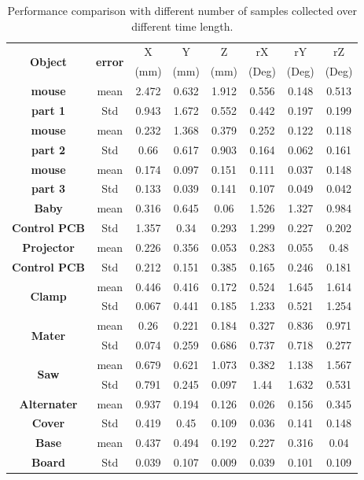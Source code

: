 \documentclass{ieeeaccess}
\begin{document}
\begin{table}
\setlength{\tabcolsep}{3pt}
\centering
\begin{tabular}{| c | c | c | c | c | c | c | c |}
\hline
\multirow{2}{*}{\textbf{Object}} & \multirow{2}{*}{\textbf{error}} & X  & Y & Z & rX & rY  & rZ  \\
 & & (mm) & (mm) & (mm) & (Deg) & (Deg) & (Deg) \\
\hline
\textbf{mouse}  & mean & 2.472 & 0.632 & 1.912 & 0.556 & 0.148 & 0.513 \\ \cline{2-8}
\textbf{part 1} & Std & 0.943 & 1.672 & 0.552 & 0.442 & 0.197 & 0.199 \\
\hline
\textbf{mouse} & mean & 0.232 & 1.368 & 0.379 & 0.252 & 0.122 & 0.118 \\ \cline{2-8}
\textbf{part 2} & Std & 0.66 & 0.617 & 0.903 & 0.164 & 0.062 & 0.161 \\
\hline
\textbf{mouse} & mean & 0.174 & 0.097 & 0.151 & 0.111 & 0.037 & 0.148 \\ \cline{2-8}
\textbf{part 3} & Std & 0.133 & 0.039 & 0.141 & 0.107 & 0.049 & 0.042 \\
\hline
\textbf{Baby} & mean & 0.316 & 0.645 & 0.06 & 1.526 & 1.327 & 0.984 \\ \cline{2-8}
\textbf{Control PCB} & Std & 1.357 & 0.34 & 0.293 & 1.299 & 0.227 & 0.202 \\ 
\hline
\textbf{Projector} & mean & 0.226 & 0.356 & 0.053 & 0.283 & 0.055 & 0.48 \\ \cline{2-8}
\textbf{Control PCB} & Std & 0.212 & 0.151 & 0.385 & 0.165 & 0.246 & 0.181 \\
\hline
\multirow{2}{*}{\textbf{Clamp}} & mean & 0.446 & 0.416 & 0.172 & 0.524 & 1.645 & 1.614 \\ \cline{2-8}
& Std & 0.067 & 0.441 & 0.185 & 1.233 & 0.521 & 1.254 \\
\hline
\multirow{2}{*}{\textbf{Mater}} & mean & 0.26 & 0.221 & 0.184 & 0.327 & 0.836 & 0.971 \\ \cline{2-8}
& Std & 0.074 & 0.259 & 0.686 & 0.737 & 0.718 & 0.277 \\
\hline
\multirow{2}{*}{\textbf{Saw}} & mean & 0.679 & 0.621 & 1.073 & 0.382 & 1.138 & 1.567 \\ \cline{2-8}
& Std & 0.791 & 0.245 & 0.097 & 1.44 & 1.632 & 0.531 \\
\hline
\textbf{Alternater} & mean & 0.937 & 0.194 & 0.126 & 0.026 & 0.156 & 0.345 \\ \cline{2-8}
\textbf{Cover} & Std & 0.419 & 0.45 & 0.109 & 0.036 & 0.141 & 0.148 \\
\hline
\textbf{Base} & mean & 0.437 & 0.494 & 0.192 & 0.227 & 0.316 & 0.04 \\ \cline{2-8}
\textbf{Board} & Std & 0.039 & 0.107 & 0.009 & 0.039 & 0.101 & 0.109 \\
\hline
\end{tabular}
\caption{Performance comparison with different number of
samples collected over different time length.}
\end{table}
\end{document}

